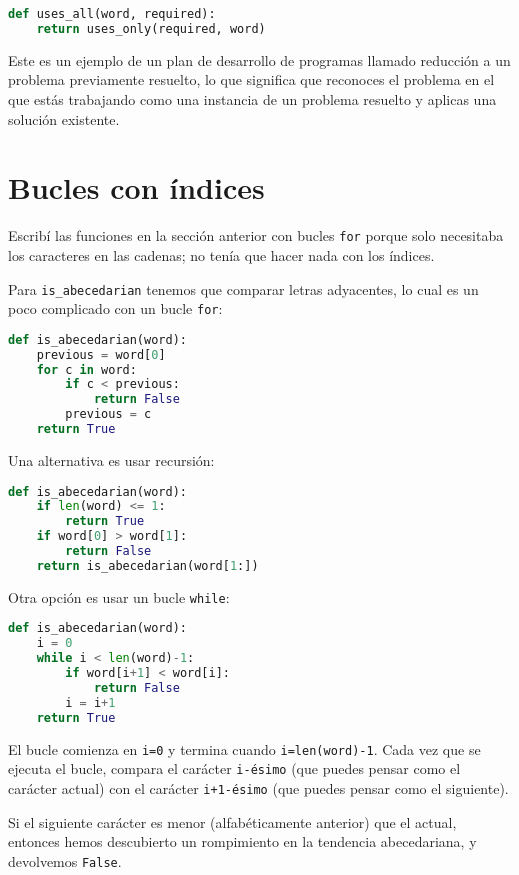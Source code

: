 \begin{lstlisting}[language=Python]
def uses_all(word, required):
    return uses_only(required, word)
\end{lstlisting}

Este es un ejemplo de un plan de desarrollo de programas llamado reducción a un problema previamente resuelto, lo que significa que reconoces el problema en el que estás trabajando como una instancia de un problema resuelto y aplicas una solución existente.

\section{Bucles con índices}

Escribí las funciones en la sección anterior con bucles \texttt{for} porque solo necesitaba los caracteres en las cadenas; no tenía que hacer nada con los índices.

Para \texttt{is\_abecedarian} tenemos que comparar letras adyacentes, lo cual es un poco complicado con un bucle \texttt{for}:

\begin{lstlisting}[language=Python]
def is_abecedarian(word):
    previous = word[0]
    for c in word:
        if c < previous:
            return False
        previous = c
    return True
\end{lstlisting}

Una alternativa es usar recursión:

\begin{lstlisting}[language=Python]
def is_abecedarian(word):
    if len(word) <= 1:
        return True
    if word[0] > word[1]:
        return False
    return is_abecedarian(word[1:])
\end{lstlisting}

Otra opción es usar un bucle \texttt{while}:

\begin{lstlisting}[language=Python]
def is_abecedarian(word):
    i = 0
    while i < len(word)-1:
        if word[i+1] < word[i]:
            return False
        i = i+1
    return True
\end{lstlisting}

El bucle comienza en \texttt{i=0} y termina cuando \texttt{i=len(word)-1}. Cada vez que se ejecuta el bucle, compara el carácter \texttt{i-ésimo} (que puedes pensar como el carácter actual) con el carácter \texttt{i+1-ésimo} (que puedes pensar como el siguiente).

Si el siguiente carácter es menor (alfabéticamente anterior) que el actual, entonces hemos descubierto un rompimiento en la tendencia abecedariana, y devolvemos \texttt{False}.

